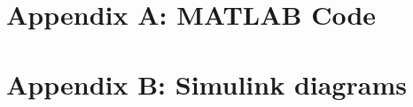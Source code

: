 \begin{appendices}
\section{Appendix A: MATLAB Code}
\label{appendix:A}


%

\section{Appendix B: Simulink diagrams}
\label{appendix:B}

\end{appendices}